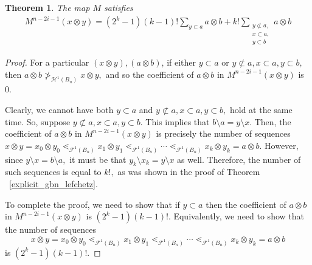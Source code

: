 \documentclass{amsart}
\newtheorem{thm}{Theorem}[subsection]
\theoremstyle{remark}
\begin{document}
\begin{thm}
The map $M$ satisfies 
\begin{align*}
	M^{n-2i-1}(x\otimes y) = (2^k - 1)(k-1)!\sum_{y \subset a}^{}a \otimes b +k! \sum_{\substack{{y \not \subset a,}\\{x\subset a,}\\{y \subset b}}}^{}a \otimes b
\end{align*}
\end{thm}
\begin{proof}

For a particular $(x\otimes y),(a \otimes b)$, if either $y \subset a$ or $y \not \subset a, x\subset a, y\subset b,$ then $a\otimes b \not >_{\mathcal H^1(B_n)} x \otimes y,$ and so the coefficient of $a\otimes b$ in $M^{n-2i-1}(x\otimes y)$ is 0.

Clearly, we cannot have both $y \subset a$ and $y \not \subset a, x\subset a, y\subset b,$ hold at the same time. So, suppose  $y \not \subset a, x\subset a, y\subset b.$ This implies that $b\setminus a = y\setminus x.$ Then, the coefficient of $a\otimes b$ in $M^{n-2i-1}(x\otimes y)$ is precisely the number of sequences $x\otimes y = x_0\otimes y_0 \lessdot_{\mathcal F^1(B_n)} x_1 \otimes y_1 \lessdot_{\mathcal F^1(B_n)}  \cdots \lessdot_{\mathcal F^1(B_n)}  x_k \otimes y_k = a\otimes b.$ However, since $y \setminus x = b\setminus a,$ it must be that $y_k \setminus x_k = y\setminus x$ as well. Therefore, the number of such sequences is equal to $k!,$ as was shown in the proof of Theorem ~\ref{explicit_gbn_lefchetz}.

To complete the proof, we need to show that if $y \subset a$ then the coefficient of $a\otimes b$ in $M^{n-2i-1}(x\otimes y)$ is $(2^k - 1)(k-1)!$. Equivalently, we need to show that the number of sequences 
\begin{equation}
\label{eqn:f_seq}
x\otimes y = x_0\otimes y_0 \lessdot_{\mathcal F^1(B_n)} x_1 \otimes y_1 \lessdot_{\mathcal F^1(B_n)}  \cdots \lessdot_{\mathcal F^1(B_n)}  x_k \otimes y_k = a\otimes b
\end{equation}
is $(2^k - 1)(k-1)!.$


\end{proof}
\end{document}
